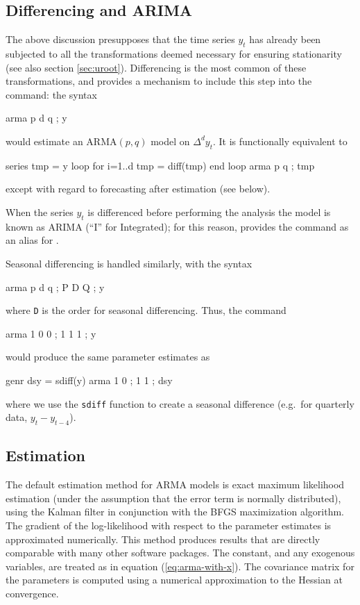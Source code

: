 \subsection{Differencing and ARIMA}

The above discussion presupposes that the time series $y_t$ has
already been subjected to all the transformations deemed necessary for
ensuring stationarity (see also section \ref{sec:uroot}). Differencing
is the most common of these transformations, and  provides
a mechanism to include this step into the  command: the
syntax
\begin{code}
  arma p d q ; y 
\end{code}
would estimate an ARMA$(p,q)$ model on $\Delta^d y_t$. It is
functionally equivalent to 
\begin{code}
  series tmp = y
  loop for i=1..d
    tmp = diff(tmp)
  end loop
  arma p q ; tmp 
\end{code}
except with regard to forecasting after estimation (see below).

When the series $y_t$ is differenced before performing the analysis
the model is known as ARIMA (``I'' for Integrated); for this reason,
 provides the  command as an alias for
.

Seasonal differencing is handled similarly, with the syntax
\begin{code}
  arma p d q ; P D Q ; y 
\end{code}
where \texttt{D} is the order for seasonal differencing.  Thus, the
command
\begin{code}
  arma 1 0 0 ; 1 1 1 ; y 
\end{code}
would produce the same parameter estimates as
\begin{code}
  genr dsy = sdiff(y)
  arma 1 0 ; 1 1 ; dsy 
\end{code}
where we use the \texttt{sdiff} function to create a seasonal
difference (e.g.\ for quarterly data, $y_t - y_{t-4}$).

\subsection{Estimation}
\label{arma-est}

The default estimation method for ARMA models is exact maximum
likelihood estimation (under the assumption that the error term is
normally distributed), using the Kalman filter in conjunction with the
BFGS maximization algorithm.  The gradient of the log-likelihood with
respect to the parameter estimates is approximated numerically.  This
method produces results that are directly comparable with many other
software packages.  The constant, and any exogenous variables, are
treated as in equation (\ref{eq:arma-with-x}).  The covariance matrix
for the parameters is computed using a numerical approximation to the
Hessian at convergence.

